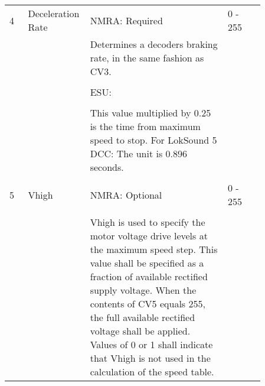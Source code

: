 \begin{tabular}{p{0.075\linewidth} p{0.15\linewidth} p{0.525\linewidth} p{0.06\linewidth} p{0.05\linewidth}}
\\
4 & Deceleration Rate & NMRA: Required & 0 - 255 & \\
& & Determines a decoders braking rate, in the same fashion as CV3.\\
\\
& & ESU:\\
\\
& & This value multiplied by 0.25 is the time from maximum speed to stop. For LokSound 5 DCC: The unit is 0.896 seconds.  & &\\
\\
5 & Vhigh & NMRA: Optional & 0 - 255 & \\
\\
& & Vhigh is used to specify the motor voltage drive levels at the maximum speed step. This value shall be specified as a fraction of available rectified supply voltage. When the contents of CV5 equals 255, the full available rectified voltage shall be applied. Values of 0 or 1 shall indicate that Vhigh is not used in the calculation of the speed table.\\

\end{tabular}
\newpage
